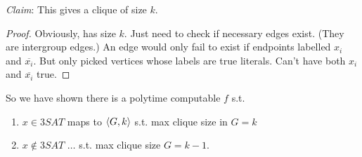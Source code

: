 \emph{Claim}: This gives a clique of size $k$.

\begin{proof}
    Obviously, has size $k$. Just need to check if necessary edges exist. (They are intergroup edges.) An edge would only fail to exist if endpoints labelled $x_i$ and $\overline{x_i}$. But only picked vertices whose labels are true literals. Can't have both $x_i$ and $\overline{x_i}$ true.
\end{proof}

So we have shown there is a polytime computable $f$ s.t.

\begin{enumerate}
    \item $x \in 3SAT$ maps to $\left \langle G, k \right \rangle$ s.t. max clique size in $G = k$
    \item  $x \notin 3SAT$ $\ldots$ s.t. max clique size $G = k - 1$.
\end{enumerate}
